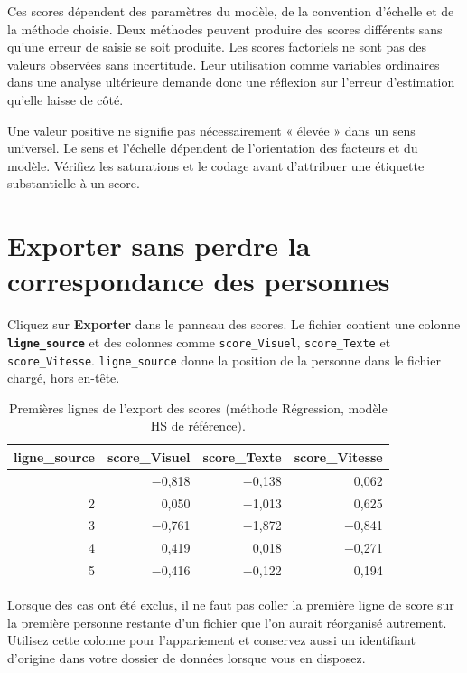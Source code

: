 \documentclass[
  french,
  11pt,
  a4paper,
  DIV=11,
  numbers=noendperiod]{scrreprt}
\begin{document}
Ces scores dépendent des paramètres du modèle, de la convention
d'échelle et de la méthode choisie. Deux méthodes peuvent produire des
scores différents sans qu'une erreur de saisie se soit produite. Les
scores factoriels ne sont pas des valeurs observées sans incertitude.
Leur utilisation comme variables ordinaires dans une analyse ultérieure
demande donc une réflexion sur l'erreur d'estimation qu'elle laisse de
côté.

Une valeur positive ne signifie pas nécessairement « élevée » dans un
sens universel. Le sens et l'échelle dépendent de l'orientation des
facteurs et du modèle. Vérifiez les saturations et le codage avant
d'attribuer une étiquette substantielle à un score.

\section{Exporter sans perdre la correspondance des
personnes}\label{exporter-sans-perdre-la-correspondance-des-personnes}

Cliquez sur \textbf{Exporter} dans le panneau des scores. Le fichier
contient une colonne \textbf{\texttt{ligne\_source}} et des colonnes
comme \texttt{score\_Visuel}, \texttt{score\_Texte} et
\texttt{score\_Vitesse}. \texttt{ligne\_source} donne la position de la
personne dans le fichier chargé, hors en-tête.


{

\begin{longtable}[]{@{}rrrr@{}}

\caption{\label{tbl-scores}Premières lignes de l'export des scores
(méthode Régression, modèle HS de référence).}

\tabularnewline

\toprule\noalign{}
ligne\_source & score\_Visuel & score\_Texte & score\_Vitesse \\
\midrule\noalign{}
\endhead
\bottomrule\noalign{}
\endlastfoot
1 & −0,818 & −0,138 & 0,062 \\
2 & 0,050 & −1,013 & 0,625 \\
3 & −0,761 & −1,872 & −0,841 \\
4 & 0,419 & 0,018 & −0,271 \\
5 & −0,416 & −0,122 & 0,194 \\

\end{longtable}

}

Lorsque des cas ont été exclus, il ne faut pas coller la première ligne
de score sur la première personne restante d'un fichier que l'on aurait
réorganisé autrement. Utilisez cette colonne pour l'appariement et
conservez aussi un identifiant d'origine dans votre dossier de données
lorsque vous en disposez.
\end{document}
